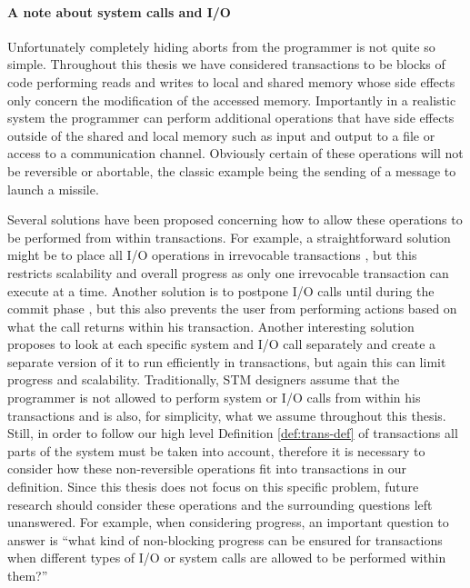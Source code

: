 \paragraph{A note about system calls and I/O}
Unfortunately completely hiding aborts from the programmer is not quite so simple.
Throughout this thesis we have considered transactions to be blocks of code
performing reads and writes to local and shared memory whose side effects only concern
the modification of the accessed memory.
Importantly in a realistic system the programmer can perform additional operations
that have side effects outside of the shared and local memory such as input and output to a file
or access to a communication channel.
Obviously certain of these operations will not be reversible or abortable,
the classic example being the sending of a message to launch a missile.

Several solutions have been proposed concerning how to allow these operations to be performed
from within transactions.
For example, a straightforward solution might be to place all I/O operations
in irrevocable transactions \cite{SSDMS08}, but this restricts scalability and overall progress
as only one irrevocable transaction can execute at a time.
Another solution is to postpone I/O calls until during the commit phase \cite{BZ07}, but this also prevents
the user from performing actions based on what the call returns within his transaction.
Another interesting solution \cite{VTGSW09} proposes to look at each specific system and I/O call separately
and create a separate version of it to run efficiently in transactions, but again this can limit progress and
scalability.
Traditionally, STM designers assume that the programmer is not allowed to perform system or I/O calls
from within his transactions and is also, for simplicity, what we assume throughout this thesis.
Still, in order to follow our high level Definition \ref{def:trans-def} of transactions all parts
of the system must be taken into account, therefore it is necessary to consider how these non-reversible operations fit into transactions
in our definition.
Since this thesis does not focus on this specific problem,
future research should consider these operations and the surrounding questions left unanswered.
For example, when considering progress, an important question
to answer is ``what kind of non-blocking progress can
be ensured for transactions when different types of I/O or system calls are allowed to be performed within them?''



